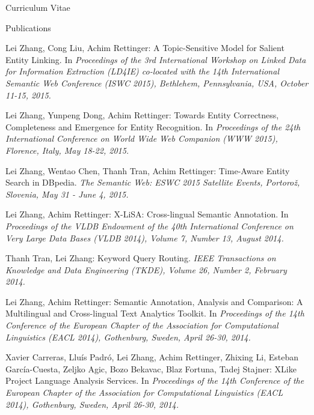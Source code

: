 \begin{cv}{\centerline{\LARGE Curriculum Vitae}}
\begin{cvlist}{Publications}
\begin{list}{}{\leftmargin=-1em}
    \item Lei Zhang, Cong Liu, Achim Rettinger: A Topic-Sensitive Model for Salient Entity Linking. In \emph{Proceedings of the 3rd International Workshop on Linked Data for Information Extraction (LD4IE) co-located with the 14th International Semantic Web Conference (ISWC 2015), Bethlehem, Pennsylvania, USA, October 11-15, 2015.}
    
    \item Lei Zhang, Yunpeng Dong, Achim Rettinger: Towards Entity Correctness, Completeness and Emergence for Entity Recognition. In \emph{Proceedings of the 24th International Conference on World Wide Web Companion (WWW 2015), Florence, Italy, May 18-22, 2015.}
    
    \item Lei Zhang, Wentao Chen, Thanh Tran, Achim Rettinger: Time-Aware Entity Search in DBpedia. \emph{The Semantic Web: ESWC 2015 Satellite Events, Portorož, Slovenia, May 31 - June 4, 2015.}
    
    \item Lei Zhang, Achim Rettinger: X-LiSA: Cross-lingual Semantic Annotation. In \emph{ Proceedings of the VLDB Endowment of the 40th International Conference on Very Large Data Bases (VLDB 2014), Volume 7, Number 13, August 2014.}
    
    \item Thanh Tran, Lei Zhang: Keyword Query Routing. \emph{IEEE Transactions on Knowledge and Data Engineering (TKDE), Volume 26, Number 2, February 2014.}
    
    \item Lei Zhang, Achim Rettinger: Semantic Annotation, Analysis and Comparison: A Multilingual and Cross-lingual Text Analytics Toolkit. In \emph{Proceedings of the 14th Conference of the European Chapter of the Association for Computational Linguistics (EACL 2014), Gothenburg, Sweden, April 26-30, 2014.}
    
    \item Xavier Carreras, Lluís Padró, Lei Zhang, Achim Rettinger, Zhixing Li, Esteban García-Cuesta, Zeljko Agic, Bozo Bekavac, Blaz Fortuna, Tadej Stajner: XLike Project Language Analysis Services. In \emph{Proceedings of the 14th Conference of the European Chapter of the Association for Computational Linguistics (EACL 2014), Gothenburg, Sweden, April 26-30, 2014.}
    

\end{list}
\end{cvlist}
\end{cv}
